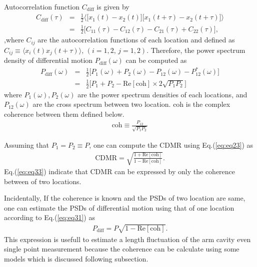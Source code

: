 \documentclass[a4paper,12pt]{book}
\begin{document}
Autocorrelation function $C_{\mathrm{diff}}$ is given by
\begin{eqnarray}
  C_{\mathrm{diff}}(\tau) &=& \frac{1}{2}
  \biggl\langle
  \biggl[ x_{1}(t)-x_{2}(t) \biggr] \biggl[ x_{1}(t+\tau)-x_{2}(t+\tau) \biggr]
  \biggr\rangle \\
  &=& \frac{1}{2}\biggl[ C_{11}(\tau) - C_{12}(\tau) - C_{21}(\tau) + C_{22}(\tau) \biggr], 
\end{eqnarray}
,where $C_{ij}$ are the autocorrelation functions of each location and defined as $ C_{ij} \equiv \langle x_{i}(t)x_{j}(t+\tau)\rangle,\, (i=1,2,\,j=1,2)$. Therefore, the power spectrum density of differential motion $P_{\mathrm{diff}}(\omega)$ can be computed as
\begin{eqnarray}
  P_{\mathrm{diff}}(\omega) &=& \frac{1}{2}\biggl[ P_{1}(\omega) + P_{2}(\omega) - P_{12}(\omega) - P_{12}^*(\omega) \biggr]\\
  &=& \frac{1}{2} \biggl[ P_{1}+P_{2} - \mathrm{Re}\left[\mathrm{coh} \right]\times2\sqrt{P_{1}P_{2}} \biggr] \label{eq:eq31}
\end{eqnarray}
where $P_{1}(\omega),P_{2}(\omega)$ are the power spectrum densities of each locations, and $P_{12}(\omega)$ are the cross spectrum between two location. $\mathrm{coh}$ is the complex coherence between them defined below.
\begin{eqnarray}
  \mathrm{coh} \equiv \frac{P_{12}}{\sqrt{P_{1}P_{2}}}
\end{eqnarray}

Assuming that $P_{1}=P_{2} \equiv P$, one can compute the CDMR using Eq.(\ref{eq:eq23}) as
\begin{eqnarray}
 \mathrm{CDMR} = \sqrt{\frac{1 + \mathrm{Re} \left[\mathrm{coh} \right] }{1 - \mathrm{Re} \left[\mathrm{coh} \right]}}. \label{eq:eq33}
\end{eqnarray}
Eq.(\ref{eq:eq33}) indicate that CDMR can be expressed by only the coherence between of two locations.

Incidentally, If the coherence is known and the PSDs of two location are same, one can estimate the PSDs of differential motion using that of one location according to Eq.(\ref{eq:eq31}) as
\begin{eqnarray}
  P_\mathrm{diff} = P \sqrt{1 - \mathrm{Re[coh]}}. \label{eq:eq34}
\end{eqnarray}
This expression is usefull to estimate a length fluctuation of the arm cavity even single point measurement because the coherence can be calculate using some models which is discussed following subsection.
\end{document}
